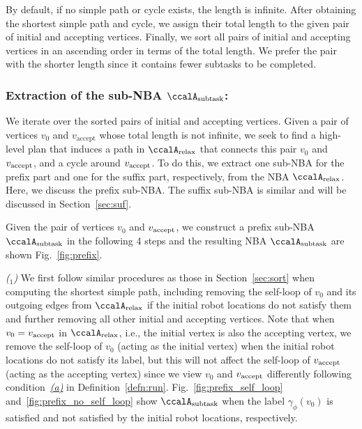 \documentclass[Afour,sageh,times]{sagej}
\newcounter{mycounter}
\newcommand{\auto}[1]{\ccalA_{\textup{#1}}}
\newcommand{\vertex}[1]{v_{\textup{#1}}}
\begin{document}
{  By default, if no simple path or cycle exists, the length is infinite. After obtaining the shortest simple path and cycle, we assign their total length to the given pair of initial and accepting vertices.  Finally,  we sort all pairs of initial and accepting vertices in an ascending order in terms of the total length. We prefer the pair with the shorter length since it contains fewer subtasks to be completed.}


  \subsubsection{Extraction of the sub-NBA \upshape $\auto{subtask}$:}\label{sub-NBA:1}
  We iterate over the sorted pairs of initial and accepting vertices. Given a pair of vertices  $v_0$ and $v_\text{accept}$ whose total length is not infinite, we seek to find a high-level plan that induces  a path in $\auto{relax}$ that connects this pair $v_0$ and $\vertex{accept}$, and a cycle around $\vertex{accept}$. To do this,  we extract one sub-NBA for the prefix part and one for the suffix part, respectively, from the NBA $\auto{relax}$.  Here, we discuss the prefix sub-NBA. The suffix sub-NBA is similar and will be  discussed in Section~\ref{sec:suf}.

  Given the pair of vertices $v_0$ and $\vertex{accept}$, we construct a prefix sub-NBA $\auto{subtask}$ in the following 4 steps and the resulting NBA $\auto{subtask}$ are shown Fig.~\ref{fig:prefix}.

   {\it ($_1$)} We first follow similar procedures as those in Section~\ref{sec:sort} when computing the shortest simple path, including removing the self-loop of $v_0$ and its outgoing edges from $\auto{relax}$ if the initial robot locations do not satisfy them and further removing all other initial and accepting vertices.  Note that when $v_0 = \vertex{accept}$ in $\auto{relax}$, i.e., the initial vertex is also the accepting vertex, we remove the self-loop of $v_0$ (acting as the initial vertex) when the initial robot locations do not satisfy its label, but this will not affect the self-loop of $\vertex{accept}$ (acting as the accepting vertex) since  we view $v_0$ and $\vertex{accept}$ differently following condition~\hyperref[cond:a]{\it (a)} in Definition~\ref{defn:run}. Fig.~\ref{fig:prefix_self_loop}  and~\ref{fig:prefix_no_self_loop} show   $\auto{subtask}$  when the label $\gamma_{\phi}(v_0)$ is satisfied and not satisfied  by the initial robot locations, respectively.
\end{document}
